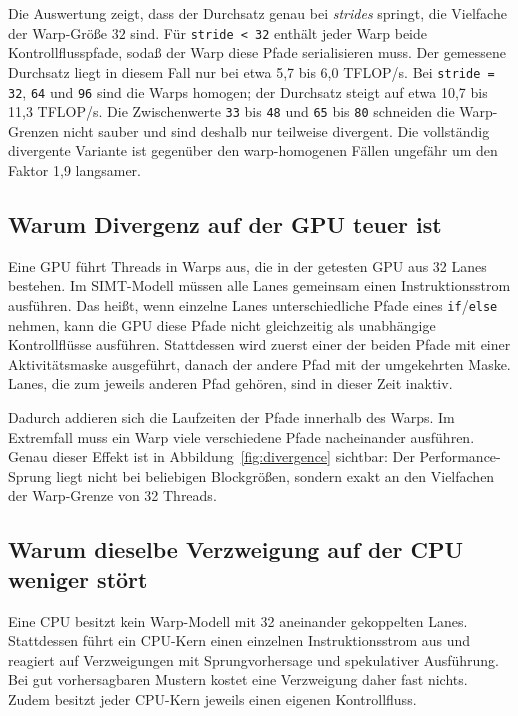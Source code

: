 Die Auswertung zeigt, dass der Durchsatz genau bei \textit{strides} springt, die
Vielfache der Warp-Größe $32$ sind. Für \texttt{stride < 32} enthält jeder Warp
beide Kontrollflusspfade, sodaß der Warp diese Pfade serialisieren muss. Der
gemessene Durchsatz liegt in diesem Fall nur bei etwa 5{,}7 bis
6{,}0 TFLOP/s. Bei \texttt{stride = 32}, \texttt{64} und \texttt{96} sind die
Warps homogen; der Durchsatz steigt auf etwa 10{,}7 bis 11{,}3 TFLOP/s.
Die Zwischenwerte \texttt{33} bis \texttt{48} und \texttt{65} bis
\texttt{80} schneiden die Warp-Grenzen nicht sauber und sind deshalb nur
teilweise divergent. Die vollständig divergente Variante ist gegenüber den
warp-homogenen Fällen ungefähr um den Faktor 1{,}9 langsamer.

\subsection{Warum Divergenz auf der GPU teuer ist}

Eine GPU führt Threads in Warps aus, die in der getesten GPU aus 32 Lanes bestehen. 
Im SIMT-Modell müssen alle Lanes gemeinsam einen Instruktionsstrom ausführen. Das heißt, wenn einzelne
Lanes unterschiedliche Pfade eines \texttt{if}/\texttt{else} nehmen, kann die
GPU diese Pfade nicht gleichzeitig als unabhängige Kontrollflüsse
ausführen. Stattdessen wird zuerst einer der beiden Pfade mit einer Aktivitätsmaske
ausgeführt, danach der andere Pfad mit der umgekehrten Maske. Lanes, die zum
jeweils anderen Pfad gehören, sind in dieser Zeit inaktiv.

Dadurch addieren sich die Laufzeiten der Pfade innerhalb des Warps. Im
Extremfall muss ein Warp viele verschiedene Pfade nacheinander ausführen. 
Genau dieser Effekt ist in Abbildung~\ref{fig:divergence} sichtbar:
Der Performance-Sprung liegt nicht bei beliebigen Blockgrößen, sondern
exakt an den Vielfachen der Warp-Grenze von 32 Threads.

\subsection{Warum dieselbe Verzweigung auf der CPU weniger stört}

Eine CPU besitzt kein Warp-Modell mit 32 aneinander gekoppelten Lanes. Stattdessen 
führt ein CPU-Kern einen einzelnen Instruktionsstrom aus und reagiert auf Verzweigungen
mit Sprungvorhersage und spekulativer Ausführung. Bei gut
vorhersagbaren Mustern kostet eine Verzweigung daher fast nichts. Zudem besitzt jeder
CPU-Kern jeweils einen eigenen Kontrollfluss.

